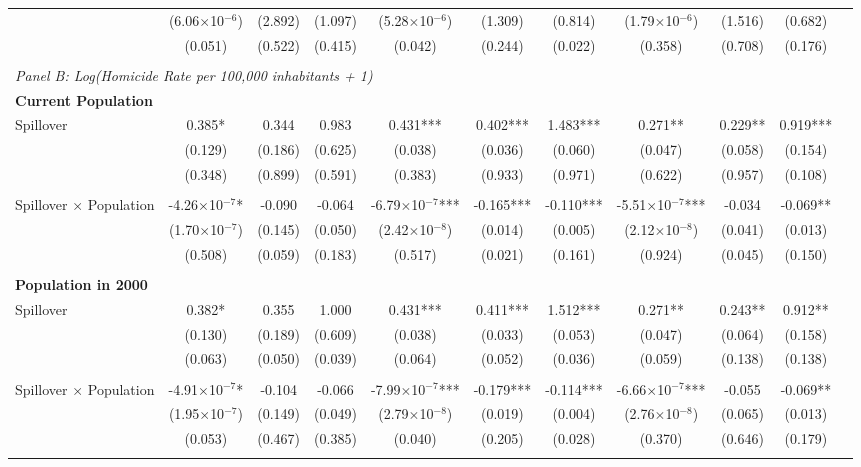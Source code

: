 \documentclass{article}
\begin{document}
\begin{table}[htbp]
\begin{adjustbox}{width=\textwidth}
\begin{tabular}{lcccccccccc}
& (6.06$\times$10$^{-6}$) & (2.892) & (1.097) & (5.28$\times$10$^{-6}$) & (1.309) & (0.814) & (1.79$\times$10$^{-6}$) & (1.516) & (0.682) \\
& (0.051) & (0.522) & (0.415) & (0.042) & (0.244) & (0.022) & (0.358) & (0.708) & (0.176) \\\\
\midrule
\multicolumn{10}{l}{\textit{Panel B: Log(Homicide Rate per 100,000 inhabitants + 1)}} \\[0.5em]
\multicolumn{10}{l}{\textbf{Current Population}} \\[0.5em]
Spillover & 0.385* & 0.344 & 0.983 & 0.431*** & 0.402*** & 1.483*** & 0.271** & 0.229** & 0.919*** \\
& (0.129) & (0.186) & (0.625) & (0.038) & (0.036) & (0.060) & (0.047) & (0.058) & (0.154) \\
& (0.348) & (0.899) & (0.591) & (0.383) & (0.933) & (0.971) & (0.622) & (0.957) & (0.108) \\\\
Spillover × Population & -4.26$\times$10$^{-7}$* & -0.090 & -0.064 & -6.79$\times$10$^{-7}$*** & -0.165*** & -0.110*** & -5.51$\times$10$^{-7}$*** & -0.034 & -0.069** \\
& (1.70$\times$10$^{-7}$) & (0.145) & (0.050) & (2.42$\times$10$^{-8}$) & (0.014) & (0.005) & (2.12$\times$10$^{-8}$) & (0.041) & (0.013) \\
& (0.508) & (0.059) & (0.183) & (0.517) & (0.021) & (0.161) & (0.924) & (0.045) & (0.150) \\\\
\multicolumn{10}{l}{\textbf{Population in 2000}} \\[0.5em]
Spillover & 0.382* & 0.355 & 1.000 & 0.431*** & 0.411*** & 1.512*** & 0.271** & 0.243** & 0.912** \\
& (0.130) & (0.189) & (0.609) & (0.038) & (0.033) & (0.053) & (0.047) & (0.064) & (0.158) \\
& (0.063) & (0.050) & (0.039) & (0.064) & (0.052) & (0.036) & (0.059) & (0.138) & (0.138) \\\\
Spillover × Population & -4.91$\times$10$^{-7}$* & -0.104 & -0.066 & -7.99$\times$10$^{-7}$*** & -0.179*** & -0.114*** & -6.66$\times$10$^{-7}$*** & -0.055 & -0.069** \\
& (1.95$\times$10$^{-7}$) & (0.149) & (0.049) & (2.79$\times$10$^{-8}$) & (0.019) & (0.004) & (2.76$\times$10$^{-8}$) & (0.065) & (0.013) \\
& (0.053) & (0.467) & (0.385) & (0.040) & (0.205) & (0.028) & (0.370) & (0.646) & (0.179) \\\\

\end{tabular}
\end{adjustbox}
\end{table}
\end{document}
